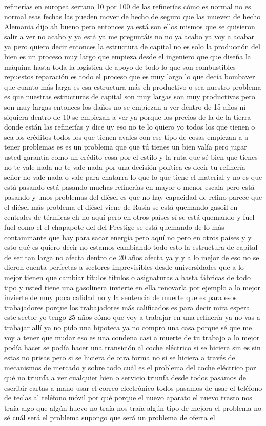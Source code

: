refinerías en europea serrano 10 por 100 de las refinerías cómo es normal no es normal esas fechas las pueden mover de hecho de seguro que las mueven de hecho Alemania dijo ah bueno pero entonces ya está son ellos mismos que se quisieron salir a ver no acabo y ya está ya me preguntáis no no ya acabo ya voy a acabar ya pero quiero decir entonces la estructura de capital no es solo la producción del bien es un proceso muy largo que empieza desde el ingeniero que que diseña la máquina hasta toda la logística de apoyo de todo lo que son combustibles repuestos reparación es todo el proceso que es muy largo lo que decía bombaver que cuanto más larga es esa estructura más eh productivo o sea nuestro problema es que nuestras estructuras de capital son muy largas son muy productivas pero son muy largas entonces los daños no se empiezan a ver dentro de 15 años ni siquiera dentro de 10 se empiezan a ver ya porque los precios de la de la tierra donde están las refinerías y dice uy eso no te lo quiero yo todos los que tienen o sea los créditos todos los que tienen avales con ese tipo de cosas empiezan a a tener problemas es es un problema que que tú tienes un bien valía pero jugar usted garantía como un crédito cosa por el estilo y la ruta que sé bien que tienes no te vale nada no te vale nada por una decisión política es decir tu refinería señor no vale nada o vale para chatarra lo que lo que tiene el material y no es que está pasando está pasando muchas refinerías en mayor o menor escala pero está pasando y unos problemas del diésel es que no hay capacidad de refino parece que el diésel más problema el diésel viene de Rusia se está quemando gasoil en centrales de térmicas eh no aquí pero en otros países sí se está quemando y fuel fuel como el el chapapote del del Prestige se está quemando de lo más contaminante que hay para sacar energía pero aquí no pero en otros países y y esto qué es quiero decir no estamos cambiando todo esto la estructura de capital de ser tan larga no afecta dentro de 20 años afecta ya y y a lo mejor de eso no se dieron cuenta perfectas a sectores imprevisibles desde universidades que a lo mejor tienen que cambiar títulos títulos o asignaturas a hasta fábricas de todo tipo y usted tiene una gasolinera invierte en ella renovarla por ejemplo a lo mejor invierte de muy poca calidad no y la sentencia de muerte que es para esos trabajadores porque los trabajadores más calificados es para decir mira espera este sector yo tengo 25 años cómo que voy a trabajar en una refinería ya no vas a trabajar allí ya no pido una hipoteca ya no compro una casa porque sé que me voy a tener que mudar eso es una condena casi a muerte de tu trabajo a lo mejor podía hacer se podía hacer una transición al coche eléctrico si se hiciera sin es sin estas no prisas pero si se hiciera de otra forma no si se hiciera a través de mecanismos de mercado y sobre todo cuál es el problema del coche eléctrico por qué no triunfa a ver cualquier bien o servicio triunfa desde todos pasamos de escribir cartas a mano usar el correo electrónico todos pasamos de usar el teléfono de teclas al teléfono móvil por qué porque el nuevo aparato el nuevo trasto nos traía algo que algún huevo no traía nos traía algún tipo de mejora el problema no sé cuál será el problema supongo que será un problema de oferta el 